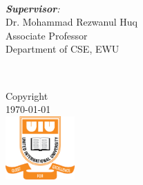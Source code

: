 \documentclass[12pt]{book} %
\begin{document}
\begin{titlepage}
\begin{minipage}{0.5\textwidth}
\begin{flushleft}
\end{flushleft}
\end{minipage}
~
\begin{minipage}{0.4\textwidth}
\begin{flushright} \large
\emph{\textbf{Supervisor}:} \\
\small
Dr. Mohammad Rezwanul Huq  \\%
Associate Professor \\
Department of CSE, EWU\\

\end{flushright}
\end{minipage}\\[3cm]



\ifx
\textregistered\textcopyright
\sffamily\textregistered\textcopyright
\fi

Copyright\\
\today\\[1cm]

\includegraphics[width=100px]{assets/uiu-logo.png}\\[1cm] %
 

\vfill %

\end{titlepage}
\end{document}
